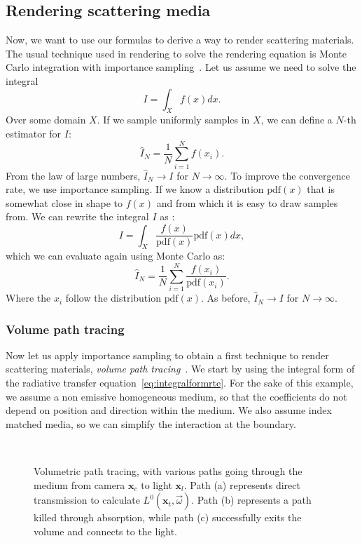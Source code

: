 \subsection{Rendering scattering media}
\label{sec:renderingscattering}
Now, we want to use our formulas to derive a way to render scattering materials. The usual technique used in rendering to solve the rendering equation is Monte Carlo integration with importance sampling~\cite{Kalos2008}. Let us assume we need to solve the integral
\begin{equation*}
I = \int_X f(x) dx.
\end{equation*}
Over some domain $X$. If we sample uniformly samples in $X$, we can define a $N$-th estimator for $I$:
\begin{equation*}
\hat{I}_N = \frac{1}{N} \sum_{i=1}^N f(x_i).
\end{equation*}
From the law of large numbers, $\hat{I}_N \rightarrow I$ for $N \rightarrow \infty$. To improve the convergence rate, we use importance sampling. If we know a distribution $\text{pdf}(x)$ that is somewhat close in shape to $f(x)$ and from which it is easy to draw samples from. We can rewrite the integral $I$ as :
\begin{equation*}
I = \int_X \frac{f(x)}{\text{pdf}(x)} \text{pdf}(x) dx,
\end{equation*}
which we can evaluate again using Monte Carlo as:
\begin{equation*}
\hat{I}_N = \frac{1}{N} \sum_{i=1}^N \frac{f(x_i)}{\text{pdf}(x_i)}.
\end{equation*}
Where the $x_i$ follow the distribution $\text{pdf}(x)$. As before, $\hat{I}_N \rightarrow I$ for $N \rightarrow \infty$.

\subsubsection{Volume path tracing}
Now let us apply importance sampling to obtain a first technique to render scattering materials,  \emph{volume path tracing}~\cite{Rushmeier1988}. We start by using the integral form of the radiative transfer equation~\ref{eq:integralformrte}. For the sake of this example, we assume a non emissive homogeneous medium, so that the coefficients do not depend on position and direction within the medium. We also assume index matched media, so we can simplify the interaction at the boundary. 

\begin{figure}
\centering
   \def\svgwidth{0.7\textwidth}
    \\
\caption{Volumetric path tracing, with various paths going through the medium from camera $\mathbf{x}_c$ to light $\mathbf{x}_l$. Path (a) represents direct transmission to calculate $L^0(\mathbf{x}_t, \vec{\omega})$. Path (b) represents a path killed through absorption, while path (c) successfully exits the volume and connects to the light.} 
\label{fig:vpt}
\end{figure}

